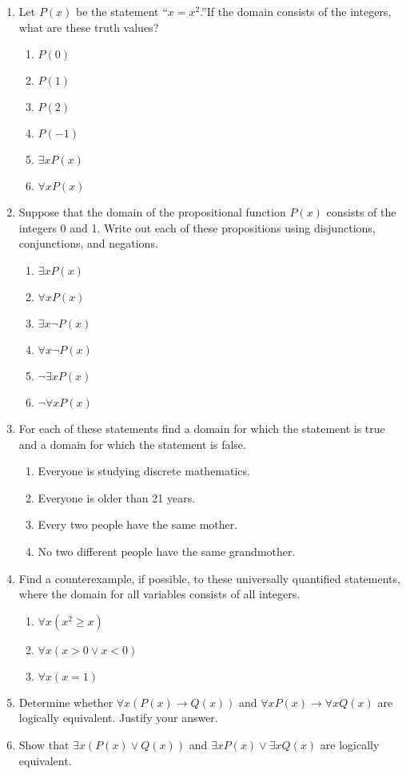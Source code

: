 \documentclass{../../cls/sig-alternate-05-2015}
\begin{document}
\begin{enumerate}
\item Let $P(x)$ be the statement \textquotedblleft $x = x^2$.\textquotedblright If the domain consists
of the integers, what are these truth values?
\begin{enumerate}
	\item $P(0)$
	\item $P(1)$
	\item $P(2)$
	\item $P(-1)$
	\item $\exists x P(x)$
	\item $\forall x P(x)$
\end{enumerate}

\item Suppose that the domain of the propositional function
$P(x)$ consists of the integers 0 and 1. Write out
each of these propositions using disjunctions, conjunctions,
and negations.
\begin{enumerate}
	\item $\exists x P(x)$
	\item $\forall x P(x)$
	\item $\exists x \neg P(x)$
	\item $\forall x \neg P(x)$
	\item $\neg \exists x P(x)$
	\item $\neg \forall x P(x)$
\end{enumerate}

\item For each of these statements find a domain for which the
statement is true and a domain for which the statement is
false.
\begin{enumerate}
	\item Everyone is studying discrete mathematics.
	\item Everyone is older than 21 years.
	\item Every two people have the same mother.
	\item No two different people have the same grandmother.
\end{enumerate}

\item Find a counterexample, if possible, to these universally
quantified statements, where the domain for all variables
consists of all integers.
\begin{enumerate}
	\item $\forall x (x^2 \ge x)$
	\item $\forall x (x > 0 \vee x < 0)$
	\item $\forall x (x = 1)$
\end{enumerate}

\item Determine whether $\forall x (P(x) \rightarrow Q(x))$ and $\forall x P(x) \rightarrow
\forall x Q(x)$ are logically equivalent. Justify your answer.

\item Show that $\exists x (P(x) \vee Q(x))$ and $\exists x P(x) \vee \exists x Q(x)$ are
logically equivalent.

\end{enumerate}
\end{document}
